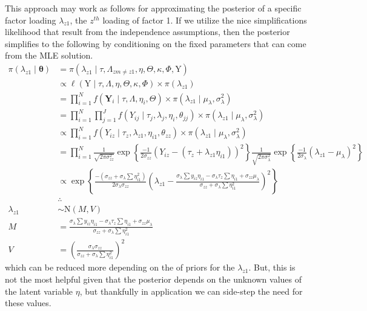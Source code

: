 \documentclass[man, noextraspace, floatsintext, 12pt]{apa7}
\begin{document}
This approach may work as follows for approximating the posterior of a specific factor loading $\lambda_{z1}$, the $z^{th}$ loading of factor 1.
If we utilize the nice simplifications likelihood that result from the independence assumptions, then the posterior simplifies to the following by conditioning on the fixed parameters that can come from the MLE solution.
\begin{align*}
\pi(\lambda_{z1} \mid \mathbf{\theta}) &= \pi(\lambda_{z1} \mid \tau, \Lambda_{zm \neq z1}, \eta,\Theta, \kappa, \Phi, \mathrm{Y})\\ 
&\propto \ell\left(\mathrm{Y} \mid \tau, \Lambda, \eta,\Theta, \kappa, \Phi\right) \times \pi(\lambda_{z1})\\
&= \prod_{i=1}^{N} f\left(\mathbf{Y}_i \mid \tau, \Lambda, \eta_i, \Theta \right)\times \pi(\lambda_{z1} \mid \mu_{\lambda}, \sigma^2_{\lambda})\\
&= \prod_{i=1}^{N} \prod_{j=1}^{J} f\left(Y_{ij} \mid \tau_j, \lambda_{j}, \eta_{i}, \theta_{jj} \right)\times \pi(\lambda_{z1} \mid \mu_{\lambda}, \sigma^2_{\lambda})\\
&\propto \prod_{i=1}^{N} f\left(Y_{iz} \mid \tau_z, \lambda_{z1}, \eta_{i1}, \theta_{zz} \right)\times \pi(\lambda_{z1} \mid \mu_{\lambda}, \sigma^2_{\lambda})\\
&= \prod_{i=1}^{N} \frac{1}{\sqrt{2\pi \sigma^2_{zz}}} \exp\left\lbrace\frac{-1}{2\sigma_{zz}} \left(Y_{iz} - (\tau_z +\lambda_{z1}\eta_{i1})\right)^2 \right\rbrace \frac{1}{\sqrt{2\pi \sigma^2_{\lambda}}} \exp\left\lbrace\frac{-1}{2\sigma_{\lambda}} \left(\lambda_{z1} - \mu_{\lambda}\right)^2 \right\rbrace\\
&\propto \exp\left\lbrace \frac{-(\sigma_{zz} + \sigma_\lambda \sum \eta_{i1}^2)}{2\sigma_{\lambda}\sigma_{zz}} \left(\lambda_{z1} - \frac{\sigma_{\lambda}\sum y_{iz}\eta_{i1} -\sigma_{\lambda}\tau_{z}\sum\eta_{i1}+\sigma_{zz}\mu_{\lambda} }{\sigma_{zz} + \sigma_\lambda \sum \eta_{i1}^2}\right)^2 \right\rbrace\\
& \therefore\\
\lambda_{z1} &\sim \mathrm{N}(M, V)\\
M &= \frac{\sigma_{\lambda}\sum y_{iz}\eta_{i1} -\sigma_{\lambda}\tau_{z}\sum\eta_{i1}+\sigma_{zz}\mu_{\lambda} }{\sigma_{zz} + \sigma_\lambda \sum \eta_{i1}^2}\\
V &= \left(\frac{\sigma_{\lambda}\sigma_{zz}}{\sigma_{zz} + \sigma_\lambda \sum \eta_{i1}^2}\right)^2
\end{align*} 
which can be reduced more depending on the of priors for the $\lambda_{z1}$.  But, this is not the most helpful given that the posterior depends on the unknown values of the latent variable $\eta$, but thankfully in application we can side-step the need for these values.
\end{document}
